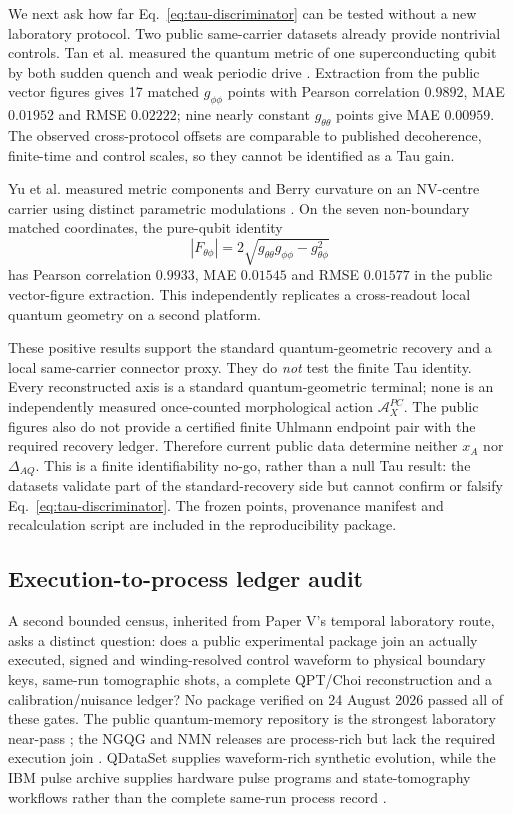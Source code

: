 \documentclass[11pt]{article}
\begin{document}
We next ask how far Eq.~\eqref{eq:tau-discriminator} can be tested without a
new laboratory protocol.  Two public same-carrier datasets already provide
nontrivial controls.  Tan et al. measured the quantum metric of one
superconducting qubit by both sudden quench and weak periodic drive
\citep{Tan2019QGT}.  Extraction from the public vector figures gives 17
matched $g_{\phi\phi}$ points with Pearson correlation $0.9892$, MAE
$0.01952$ and RMSE $0.02222$; nine nearly constant $g_{\theta\theta}$ points
give MAE $0.00959$.  The observed cross-protocol offsets are comparable to
published decoherence, finite-time and control scales, so they cannot be
identified as a Tau gain.

Yu et al. measured metric components and Berry curvature on an NV-centre
carrier using distinct parametric modulations \citep{Yu2019QGT}.  On the seven
non-boundary matched coordinates, the pure-qubit identity
\begin{equation}
 |F_{\theta\phi}|=
 2\sqrt{g_{\theta\theta}g_{\phi\phi}-g_{\theta\phi}^2}
\end{equation}
has Pearson correlation $0.9933$, MAE $0.01545$ and RMSE $0.01577$ in the
public vector-figure extraction.  This independently replicates a
cross-readout local quantum geometry on a second platform.

These positive results support the standard quantum-geometric recovery and a
local same-carrier connector proxy.  They do \emph{not} test the finite Tau
identity.  Every reconstructed axis is a standard quantum-geometric terminal;
none is an independently measured once-counted morphological action
$\mathcal A_X^{PC}$.  The public figures also do not provide a certified
finite Uhlmann endpoint pair with the required recovery ledger.  Therefore
current public data determine neither $x_A$ nor $\Delta_{AQ}$.  This is a
finite identifiability no-go, rather than a null Tau result: the datasets
validate part of the standard-recovery side but cannot confirm or falsify
Eq.~\eqref{eq:tau-discriminator}.  The frozen points, provenance manifest and
recalculation script are included in the reproducibility package.

\subsection{Execution-to-process ledger audit}

A second bounded census, inherited from Paper V's temporal laboratory route,
asks a distinct question: does a public experimental package join an actually
executed, signed and winding-resolved control waveform to physical boundary
keys, same-run tomographic shots, a complete QPT/Choi reconstruction and a
calibration/nuisance ledger? No package verified on 24 August 2026 passed all
of these gates. The public quantum-memory repository is the strongest
laboratory near-pass \citep{HsiangQMemRepo}; the NGQG and NMN releases are
process-rich but lack the required execution join
\citep{ZhangNGQGData,GiarmatziNMNRepo}. QDataSet supplies waveform-rich
synthetic evolution, while the IBM pulse archive supplies hardware pulse
programs and state-tomography workflows rather than the complete same-run
process record \citep{PerrierQDataSetRepo,IBMOpenSciencePulse2021}.
\end{document}
